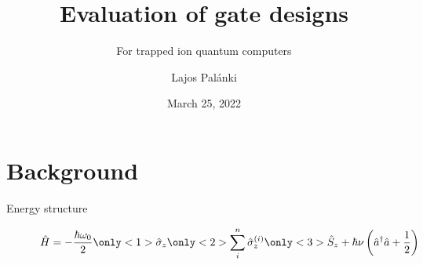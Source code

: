 \documentclass[aspectratio=169]{beamer}
\title{Evaluation of gate designs} %
\subtitle{For trapped ion quantum computers}
\author[L. Pal\' anki]{Lajos Pal\' anki}
\institute[ICL]{
    Department of Physics%
    \\%
    Imperial College London%
} %
\date{March 25, 2022}
\begin{document}
    
    \frame{\titlepage}
    
    
    
    
    
    \section{Background}
	\begin{frame}{Energy structure}
		\begin{figure}
			\centering
			\[\hat{H}=-\frac{\hbar\omega_0}{2}\only<1>{\hat{\sigma}_z}\only<2>{\sum_i^n\hat{\sigma}_z^{(i)}}\only<3>{\hat{S}_z}+ \hbar\nu \left(\hat{a}^\dagger\hat{a} + \frac{1}{2}\right)\]
		\end{figure}
	\end{frame}
\end{document}
